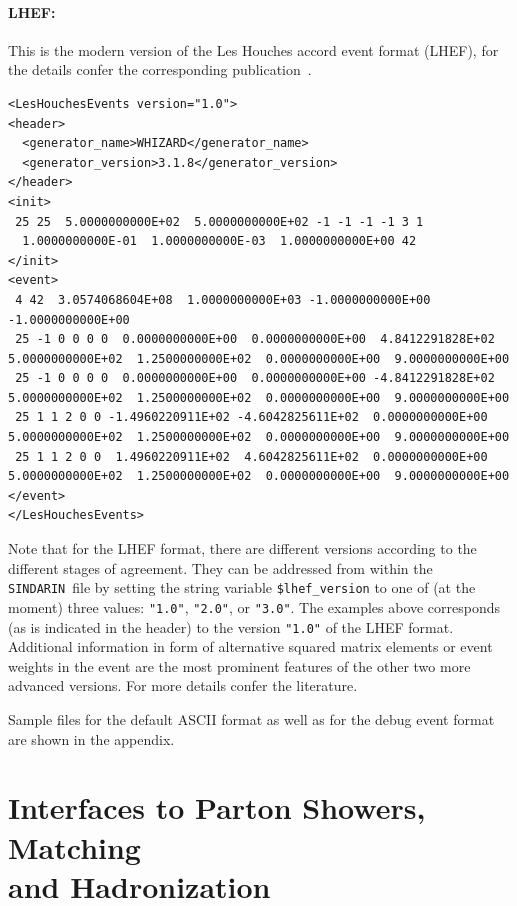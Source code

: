 \documentclass[12pt]{book}
\newcommand{\ttt}[1]{\texttt{#1}}
\newcommand{\sindarin}{\ttt{SINDARIN}}
\begin{document}
\paragraph{LHEF:}

This is the modern version of the Les Houches accord event format
(LHEF), for the details confer the corresponding publication~\cite{LHEF}.

\begin{scriptsize}
  \begin{verbatim}
<LesHouchesEvents version="1.0">
<header>
  <generator_name>WHIZARD</generator_name>
  <generator_version>3.1.8</generator_version>
</header>
<init>
 25 25  5.0000000000E+02  5.0000000000E+02 -1 -1 -1 -1 3 1
  1.0000000000E-01  1.0000000000E-03  1.0000000000E+00 42
</init>
<event>
 4 42  3.0574068604E+08  1.0000000000E+03 -1.0000000000E+00 -1.0000000000E+00
 25 -1 0 0 0 0  0.0000000000E+00  0.0000000000E+00  4.8412291828E+02  5.0000000000E+02  1.2500000000E+02  0.0000000000E+00  9.0000000000E+00
 25 -1 0 0 0 0  0.0000000000E+00  0.0000000000E+00 -4.8412291828E+02  5.0000000000E+02  1.2500000000E+02  0.0000000000E+00  9.0000000000E+00
 25 1 1 2 0 0 -1.4960220911E+02 -4.6042825611E+02  0.0000000000E+00  5.0000000000E+02  1.2500000000E+02  0.0000000000E+00  9.0000000000E+00
 25 1 1 2 0 0  1.4960220911E+02  4.6042825611E+02  0.0000000000E+00  5.0000000000E+02  1.2500000000E+02  0.0000000000E+00  9.0000000000E+00
</event>
</LesHouchesEvents>
  \end{verbatim}
\end{scriptsize}

Note that for the LHEF format, there are different versions according
to the different stages of agreement. They can be addressed from
within the \sindarin\ file by setting the string variable
\ttt{\$lhef\_version} to one of (at the moment) three values:
\ttt{"1.0"}, \ttt{"2.0"}, or \ttt{"3.0"}. The examples above
corresponds (as is indicated in the header) to the version \ttt{"1.0"}
of the LHEF format. Additional information in form of alternative
squared matrix elements or event weights in the event are the most
prominent features of the other two more advanced versions. For more
details confer the literature.

\vspace{.5cm}

Sample files for the default ASCII format as well as for the debug
event format are shown in the appendix.


\section[Interfaces to Parton Showers, Matching and
Hadronization]{Interfaces to Parton Showers, Matching\\and
  Hadronization}
\end{document}
